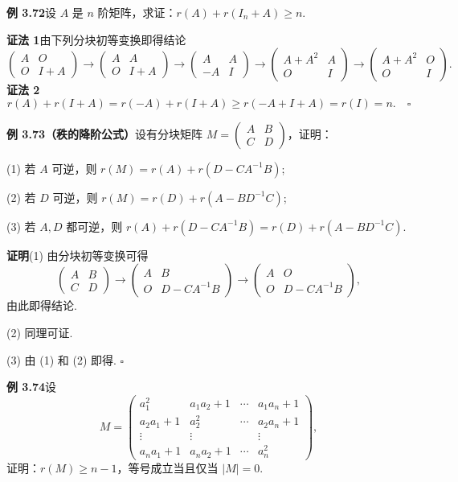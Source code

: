 \documentclass[UTF8, 12pt, fontset=fandol, oneside]{ctexart}
\begin{document}
\noindent\textbf{例 3.72}\quad 设 $A$ 是 $n$ 阶矩阵，求证：$r(A)+r(I_n+A)\ge n$.

\noindent\textbf{证法 1}\quad 由下列分块初等变换即得结论
\[
\begin{pmatrix}A&O\\O&I+A\end{pmatrix}
\to
\begin{pmatrix}A&A\\O&I+A\end{pmatrix}
\to
\begin{pmatrix}A&A\\-A&I\end{pmatrix}
\to
\begin{pmatrix}A+A^2&A\\O&I\end{pmatrix}
\to
\begin{pmatrix}A+A^2&O\\O&I\end{pmatrix}.
\]
\noindent\textbf{证法 2}\quad
\[
r(A)+r(I+A)=r(-A)+r(I+A)\ge r(-A+I+A)=r(I)=n. \quad \square
\]

\noindent\textbf{例 3.73（秩的降阶公式）}\quad 设有分块矩阵 $M=\begin{pmatrix}A&B\\C&D\end{pmatrix}$，证明：

(1) 若 $A$ 可逆，则 $r(M)=r(A)+r(D-CA^{-1}B)$;

(2) 若 $D$ 可逆，则 $r(M)=r(D)+r(A-BD^{-1}C)$;

(3) 若 $A,D$ 都可逆，则 $r(A)+r(D-CA^{-1}B)=r(D)+r(A-BD^{-1}C)$.

\noindent\textbf{证明}\quad (1) 由分块初等变换可得
\[
\begin{pmatrix}A&B\\C&D\end{pmatrix}
\to
\begin{pmatrix}A&B\\O&D-CA^{-1}B\end{pmatrix}
\to
\begin{pmatrix}A&O\\O&D-CA^{-1}B\end{pmatrix},
\]
由此即得结论.

(2) 同理可证.

(3) 由 (1) 和 (2) 即得. $\square$

\noindent\textbf{例 3.74}\quad 设
\[
M=
\begin{pmatrix}
a_1^2 & a_1a_2+1 & \cdots & a_1a_n+1\\
a_2a_1+1 & a_2^2 & \cdots & a_2a_n+1\\
\vdots & \vdots &        & \vdots\\
a_na_1+1 & a_na_2+1 & \cdots & a_n^2
\end{pmatrix},
\]
证明：$r(M)\ge n-1$，等号成立当且仅当 $|M|=0$.
\end{document}
